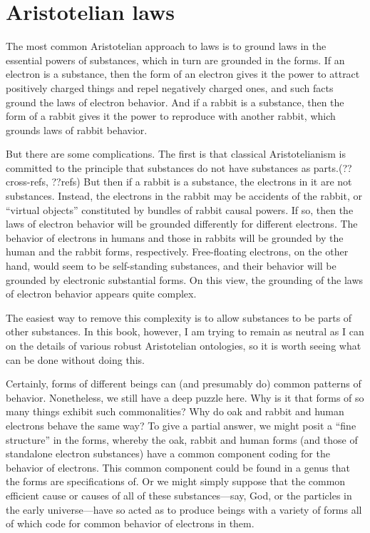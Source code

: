 \section{Aristotelian laws}
The most common Aristotelian approach to laws is to ground laws in the essential powers of substances, which in turn are
grounded in the forms. If an electron is a substance, then the form of an electron gives it the power to attract positively 
charged things and repel negatively charged ones, and such facts ground the laws of electron behavior. And if a rabbit is 
a substance, then the form of a rabbit gives it the power to reproduce with another rabbit, which grounds laws of rabbit
behavior. 

But there are some complications. The first is that classical Aristotelianism is committed to the principle that 
substances do not have substances as parts.(??cross-refs, ??refs) But then if a rabbit is a substance, the electrons in
it are not substances. Instead, the electrons in the rabbit may be accidents of the rabbit, or ``virtual objects'' 
constituted by bundles of rabbit causal powers. If so, then the laws of electron behavior will be grounded differently
for different electrons. The behavior of electrons in humans and those in rabbits will be grounded by the human and the 
rabbit forms, respectively. Free-floating electrons, on the other hand, would seem to be self-standing substances, and
their behavior will be grounded by electronic substantial forms. On this view, the grounding of the laws of electron 
behavior appears quite complex.

The easiest way to remove this complexity is to allow substances to be parts of other substances. In this book, however, 
I am trying to remain as neutral as I can on the details of various robust Aristotelian ontologies, so it is worth seeing
what can be done without doing this.

Certainly, forms of different beings can (and presumably do) common patterns of behavior.  Nonetheless, we still have a 
deep puzzle here. Why is it that forms of so many things exhibit such commonalities? Why do oak and rabbit and human
electrons behave the same way? To give a partial answer, we might posit a ``fine structure'' in the forms, whereby the oak, 
rabbit and human forms (and those of standalone electron substances) have a common component coding for the behavior of 
electrons. This common component could be found in a genus that the forms are specifications of. Or we might simply suppose
that the common efficient cause or causes of all of these substances---say, God, or the particles in the early universe---have
so acted as to produce beings with a variety of forms all of which code for common behavior of electrons in them. 

